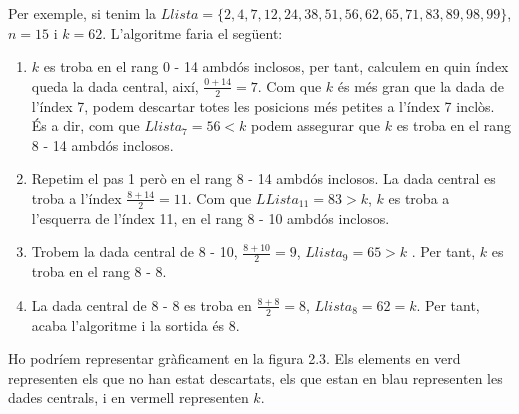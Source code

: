 

Per exemple, si tenim la $Llista = \lbrace 2, 4, 7, 12, 24, 38, 51, 56, 62, 65, 71, 83, 89, 98, 99 \rbrace$, $n = 15$ i $k = 62$. L'algoritme faria el següent:


\begin{enumerate}
\item $k$ es troba en el rang 0 - 14 ambdós inclosos, per tant,  calculem en quin índex queda la dada central, així, $\frac{0+14}{2} = 7$. Com que $k$ és més gran que la dada de l'índex 7, podem descartar totes les posicions més petites a l'índex 7 inclòs. És a dir, com que $Llista_7 = 56 < k$  podem assegurar que $k$ es troba en el rang 8 - 14 ambdós inclosos.
\item Repetim el pas 1 però en el rang 8 - 14 ambdós inclosos. La dada central es troba a l'índex $\frac{8+14}{2} = 11$. Com que $LLista_{11} = 83 > k$, $k$ es troba a l'esquerra de l'índex 11, en el rang 8 - 10 ambdós inclosos. 
\item Trobem la dada central de 8 - 10, $\frac{8+10}{2} = 9$, $Llista_9 = 65 > k$ . Per tant, $k$ es troba en el rang 8 - 8.
\item La dada central de 8 - 8 es troba en $\frac{8+8}{2} = 8$, $Llista_8 = 62 = k$. Per tant, acaba l'algoritme i la sortida és 8. 
\end{enumerate}

Ho podríem representar gràficament en la figura 2.3. Els elements en verd representen els que no han estat descartats, els que estan en blau representen les dades centrals, i en vermell representen $k$.

